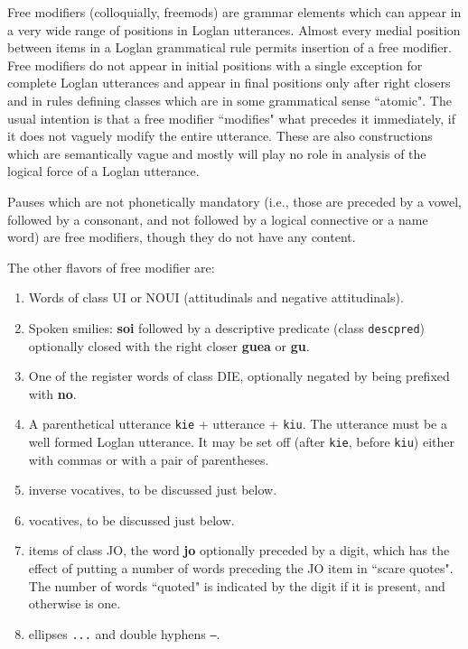 \documentclass[12pt]{book}
\begin{document}
Free modifiers (colloquially, freemods) are grammar elements which can appear in a very wide range of positions in Loglan utterances.  Almost every medial position between items in a Loglan grammatical rule permits insertion of a free modifier.  Free modifiers do not appear in initial positions with a single exception for
complete Loglan utterances and appear in final positions only after right closers and in rules defining classes which are in some grammatical sense ``atomic".  The usual intention is that a free modifier ``modifies" what precedes it immediately, if it does not vaguely modify the entire utterance.  These are also constructions which are semantically vague and mostly will play no role in analysis of the logical force of a Loglan utterance.

Pauses which are not phonetically mandatory (i.e., those are preceded by a vowel, followed by a consonant, and not followed by a logical connective or a name word) are free modifiers, though they do not have any content.

The other flavors of free modifier are:

\begin{enumerate}

\item  Words of class UI or NOUI (attitudinals and negative attitudinals).

\item  Spoken smilies:  {\bf soi} followed by a descriptive predicate (class {\tt descpred}) optionally closed with the right closer {\bf guea} or {\bf gu}.

\item  One of the register words of class DIE, optionally negated by being prefixed with {\bf no}.

\item  A parenthetical utterance {\tt kie} + utterance + {\tt kiu}.  The utterance must be a well formed Loglan utterance.  It may be set off (after {\tt kie}, before {\tt kiu}) either with commas or with a pair of parentheses.

\item inverse vocatives, to be discussed just below.

\item  vocatives, to be discussed just below.

\item  items of class JO, the word {\bf jo} optionally preceded by a digit, which has the effect of putting a number of words preceding the JO item in ``scare quotes".  The number of words ``quoted" is indicated by the digit if it is present, and otherwise is one.

\item ellipses {\tt ...} and double hyphens {\tt --}.

\end{enumerate}
\end{document}

